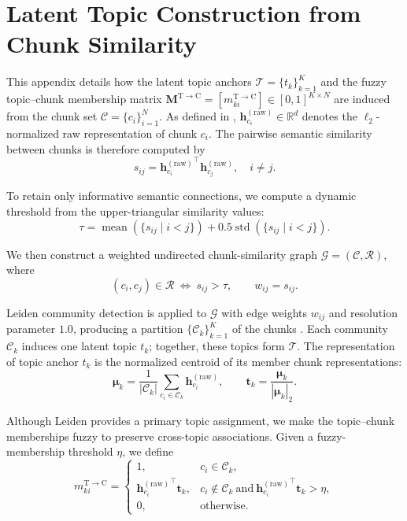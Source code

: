 \documentclass{article} %
\begin{document}
\section{Latent Topic Construction from Chunk Similarity}
\label{app:latent_topic_construction}

This appendix details how the latent topic anchors
$\mathcal{T}=\{t_k\}_{k=1}^{K}$ and the fuzzy topic--chunk membership
matrix $\mathbf{M}^{\mathrm{T}\to\mathrm{C}}
=[m_{ki}^{\mathrm{T}\to\mathrm{C}}]\in[0,1]^{K\times N}$ are induced from the chunk set
$\mathcal{C}=\{c_i\}_{i=1}^{N}$. As defined in
, $\mathbf{h}_{c_i}^{(\mathrm{raw})}
\in\mathbb{R}^{d}$ denotes the $\ell_2$-normalized raw representation of
chunk $c_i$. The pairwise semantic similarity between chunks is therefore
computed by
\begin{equation}
s_{ij}={\mathbf{h}_{c_i}^{(\mathrm{raw})}}^{\top}\mathbf{h}_{c_j}^{(\mathrm{raw})},
\quad i\neq j.
\end{equation}

To retain only informative semantic connections, we compute a dynamic
threshold from the upper-triangular similarity values:
\begin{equation}
\tau=\operatorname{mean}\left(\{s_{ij}\mid i<j\}\right)
+0.5\operatorname{std}\left(\{s_{ij}\mid i<j\}\right).
\end{equation}

We then construct a weighted undirected chunk-similarity graph
$\mathcal{G}=(\mathcal{C},\mathcal{R})$, where
\begin{equation}
(c_i,c_j)\in\mathcal{R}\ \Longleftrightarrow\ s_{ij}>\tau,
\qquad w_{ij}=s_{ij}.
\end{equation}

Leiden community detection is applied to $\mathcal{G}$ with edge weights
$w_{ij}$ and resolution parameter $1.0$, producing a partition
$\{\mathcal{C}_k\}_{k=1}^{K}$ of the chunks \citep{Traag2019Leiden}.
Each community $\mathcal{C}_k$ induces one latent topic $t_k$; together,
these topics form $\mathcal{T}$. The representation of topic anchor $t_k$
is the normalized centroid of its member chunk representations:
\begin{equation}
\boldsymbol{\mu}_k=\frac{1}{|\mathcal{C}_k|}
\sum_{c_i\in\mathcal{C}_k}\mathbf{h}_{c_i}^{(\mathrm{raw})},
\qquad
\mathbf{t}_k=\frac{\boldsymbol{\mu}_k}{|\boldsymbol{\mu}_k|_2}.
\end{equation}

Although Leiden provides a primary topic assignment, we make the
topic--chunk memberships fuzzy to preserve cross-topic associations. Given
a fuzzy-membership threshold $\eta$, we define
\begin{equation}
m_{ki}^{\mathrm{T}\to\mathrm{C}}=
\begin{cases}
1, & c_i\in\mathcal{C}_k,\\
{\mathbf{h}_{c_i}^{(\mathrm{raw})}}^{\top}\mathbf{t}_k,
& c_i\notin\mathcal{C}_k\ \text{and}\
{\mathbf{h}_{c_i}^{(\mathrm{raw})}}^{\top}\mathbf{t}_k>\eta,\\
0, & \text{otherwise}.
\end{cases}
\end{equation}
\end{document}
